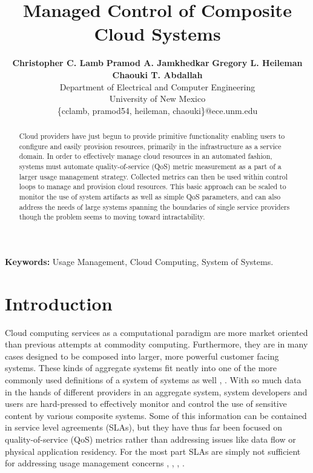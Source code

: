 \documentclass[times, 10pt,twocolumn]{article}
\begin{document}
\title{Managed Control of Composite Cloud Systems}

\author{
        \textbf{Christopher C. Lamb}\hspace*{0.1in}
        \textbf{Pramod A. Jamkhedkar}\hspace*{0.1in}
        \textbf{Gregory L. Heileman}\hspace*{0.1in}
        \textbf{Chaouki T. Abdallah}\\
        Department of Electrical and Computer Engineering \\
        University of New Mexico \\
        \small{\{cclamb, pramod54, heileman, chaouki\}@ece.unm.edu}
}

\maketitle
\thispagestyle{empty}

\begin{abstract}
Cloud providers have just begun to provide primitive functionality enabling users to configure and easily provision resources, primarily in the infrastructure as a service domain.  In order to effectively manage cloud resources in an automated fashion, systems must automate quality-of-service (QoS) metric measurement as a part of a larger usage management strategy.  Collected metrics can then be used within control loops to manage and provision cloud resources.  This basic approach can be scaled to monitor the use of system artifacts as well as simple QoS parameters, and can also address the needs of large systems spanning the boundaries of single service providers though the problem seems to moving toward intractability.
\end{abstract}

{
\setlength{\parindent}{0mm}
\textbf{Keywords:} Usage Management, Cloud Computing, System of Systems.
}

\section{Introduction}
Cloud computing services as a computational paradigm are more market oriented than previous attempts at commodity computing.  Furthermore, they are in many cases designed to be composed into larger, more powerful customer facing systems.  These kinds of aggregate systems fit neatly into one of the more commonly used definitions of a system of systems as well \cite{Sose:SageCuppan:2001}, \cite{Sose:Web:Defns}.  With so much data in the hands of different providers in an aggregate system, system developers and users are hard-pressed to effectively monitor and control the use of sensitive content by various composite systems.  Some of this information can be contained in service level agreements (SLAs), but they have thus far been focused on quality-of-service (QoS) metrics rather than addressing issues like data flow or physical application residency.  For the most part SLAs are simply not sufficient for addressing usage management concerns \cite{WSA}, \cite{WSLA}, \cite{WSP}, \cite{PaRaSh:09}.
\end{document}
